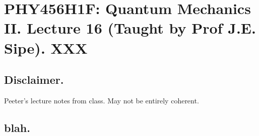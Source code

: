 
%

\chapter{PHY456H1F: Quantum Mechanics II.  Lecture 16 (Taught by Prof J.E. Sipe).  XXX}
\label{chap:qmTwoL16}
{}
\date{Nov 2, 2011}

\beginArtWithToc

\section{Disclaimer.}

Peeter's lecture notes from class.  May not be entirely coherent.

\section{blah.}

\cite{desai2009quantum}

\EndArticle
